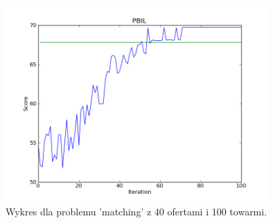 \begin{figure}[!ht]
    \centering
    \includegraphics[width=10cm]{wykresy/matching_bids_100_goods_40_0000_txt_pbil.png}
    \caption{Wykres dla problemu 'matching' z 40 ofertami i 100 towarmi.}
    \label{wyk:pbil2}
\end{figure}
